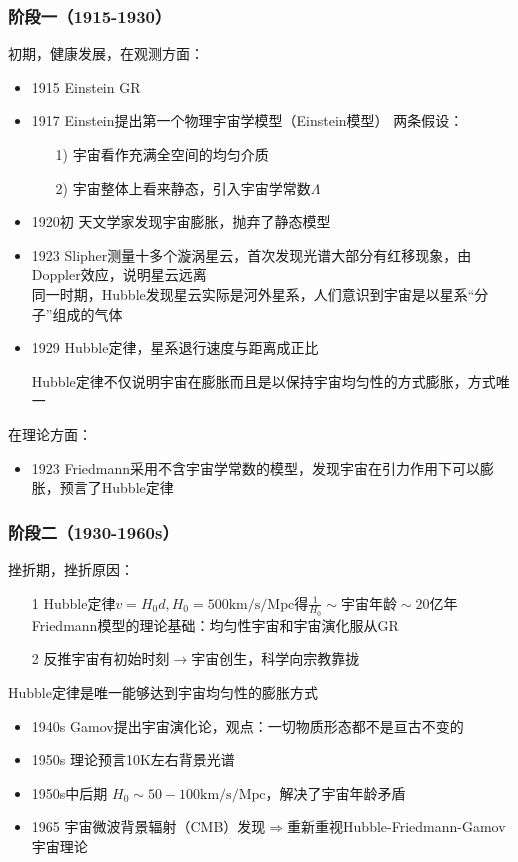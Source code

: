 \subsubsection{阶段一（1915-1930）}
\par 
初期，健康发展，在观测方面：
\begin{itemize}
	\item 1915 Einstein GR
	\item 1917 Einstein提出第一个物理宇宙学模型（Einstein模型）
	两条假设：
	\begin{itemize}
		\item[1)] 宇宙看作充满全空间的均匀介质
		\item[2)] 宇宙整体上看来静态，引入宇宙学常数$\Lambda$
	\end{itemize}
	\item 1920初 \quad 天文学家发现宇宙膨胀，抛弃了静态模型
	\item 1923 Slipher测量十多个漩涡星云，首次发现光谱大部分有红移现象，由Doppler效应，说明星云远离\\ 同一时期，Hubble发现星云实际是河外星系，人们意识到宇宙是以星系“分子”组成的气体
	
	\item 1929 Hubble定律，星系退行速度与距离成正比
	\begin{cnote}
		Hubble定律不仅说明宇宙在膨胀而且是以保持宇宙均匀性的方式膨胀，方式唯一
	\end{cnote}

\end{itemize}
\par 
在理论方面：
\begin{itemize}
	\item 1923 Friedmann采用不含宇宙学常数的模型，发现宇宙在引力作用下可以膨胀，预言了Hubble定律
\end{itemize}

\subsubsection{阶段二（1930-1960s）}
\par
挫折期，挫折原因：
\begin{itemize}
	\item[1] Hubble定律$v = H_0 d, H_0 = 500 \mathrm{km/s/Mpc}$得$\frac{1}{H_0}\sim \text{宇宙年龄} \sim \text{20亿年}$ \\
	Friedmann模型的理论基础：均匀性宇宙和宇宙演化服从GR
	\item[2] 反推宇宙有初始时刻$\rightarrow$宇宙创生，科学向宗教靠拢
\end{itemize}
\begin{cnote}
	Hubble定律是唯一能够达到宇宙均匀性的膨胀方式
\end{cnote}
\begin{itemize}
	\item 1940s Gamov提出宇宙演化论，观点：一切物质形态都不是亘古不变的
	\item 1950s 理论预言10K左右背景光谱
	\item 1950s中后期 $H_0 \sim 50-100 \mathrm{km/s/Mpc}$，解决了宇宙年龄矛盾
	\item 1965 宇宙微波背景辐射（CMB）发现$\Rightarrow$重新重视Hubble-Friedmann-Gamov宇宙理论
\end{itemize}

